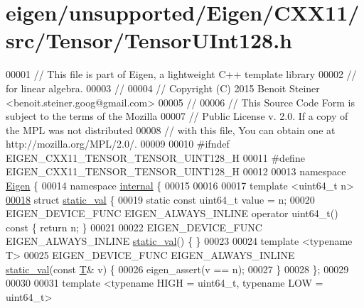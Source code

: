 \hypertarget{eigen_2unsupported_2_eigen_2_c_x_x11_2src_2_tensor_2_tensor_u_int128_8h_source}{}\section{eigen/unsupported/\+Eigen/\+C\+X\+X11/src/\+Tensor/\+Tensor\+U\+Int128.h}
\label{eigen_2unsupported_2_eigen_2_c_x_x11_2src_2_tensor_2_tensor_u_int128_8h_source}

\begin{DoxyCode}
00001 \textcolor{comment}{// This file is part of Eigen, a lightweight C++ template library}
00002 \textcolor{comment}{// for linear algebra.}
00003 \textcolor{comment}{//}
00004 \textcolor{comment}{// Copyright (C) 2015 Benoit Steiner <benoit.steiner.goog@gmail.com>}
00005 \textcolor{comment}{//}
00006 \textcolor{comment}{// This Source Code Form is subject to the terms of the Mozilla}
00007 \textcolor{comment}{// Public License v. 2.0. If a copy of the MPL was not distributed}
00008 \textcolor{comment}{// with this file, You can obtain one at http://mozilla.org/MPL/2.0/.}
00009 
00010 \textcolor{preprocessor}{#ifndef EIGEN\_CXX11\_TENSOR\_TENSOR\_UINT128\_H}
00011 \textcolor{preprocessor}{#define EIGEN\_CXX11\_TENSOR\_TENSOR\_UINT128\_H}
00012 
00013 \textcolor{keyword}{namespace }\hyperlink{namespace_eigen}{Eigen} \{
00014 \textcolor{keyword}{namespace }\hyperlink{namespaceinternal}{internal} \{
00015 
00016 
00017 \textcolor{keyword}{template} <u\textcolor{keywordtype}{int}64\_t n>
\hyperlink{struct_eigen_1_1internal_1_1static__val}{00018} \textcolor{keyword}{struct }\hyperlink{struct_eigen_1_1internal_1_1static__val}{static\_val} \{
00019   \textcolor{keyword}{static} \textcolor{keyword}{const} uint64\_t value = n;
00020   EIGEN\_DEVICE\_FUNC EIGEN\_ALWAYS\_INLINE \textcolor{keyword}{operator} uint64\_t()\textcolor{keyword}{ const }\{ \textcolor{keywordflow}{return} n; \}
00021 
00022   EIGEN\_DEVICE\_FUNC EIGEN\_ALWAYS\_INLINE \hyperlink{struct_eigen_1_1internal_1_1static__val}{static\_val}() \{ \}
00023 
00024   \textcolor{keyword}{template} <\textcolor{keyword}{typename} T>
00025   EIGEN\_DEVICE\_FUNC EIGEN\_ALWAYS\_INLINE \hyperlink{struct_eigen_1_1internal_1_1static__val}{static\_val}(\textcolor{keyword}{const} \hyperlink{group___sparse_core___module}{T}& v) \{
00026     eigen\_assert(v == n);
00027   \}
00028 \};
00029 
00030 
00031 \textcolor{keyword}{template} <\textcolor{keyword}{typename} HIGH = u\textcolor{keywordtype}{int}64\_t, \textcolor{keyword}{typename} LOW = u\textcolor{keywordtype}{int}64\_t>

\end{DoxyCode}
